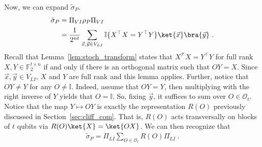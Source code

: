 \documentclass[11pt]{article}
\newcommand{\T}{\ensuremath{\mathcal{T}}}
\newcommand{\id}{\ensuremath{\mathbb{I}}}
\newcommand{\F}{\mathbb{F}}
\newcommand{\Oc}{\mathcal{O}}
\begin{document}
Now, we can expand $\tilde{\sigma}_P$.
\begin{align}
    \tilde{\sigma}_P & = \Pi_{VI} \rho_P \Pi_{VI}\\
    & = \frac{1}{2^{nt}} \sum_{\vec{x},\vec{y} \in V_{LI}}\id\{X^\top X = Y^\top Y\}\ket{\vec{x}}\bra{\vec{y}}\ .
\end{align}
Recall that Lemma~\ref{lem:stoch_transform} states that $X^\T X = Y^\top Y$ for full rank $X,Y \in \F_2^{t\times n}$ if and only if there is an orthogonal matrix such that $OY=X$. Since $\vec{x}, \vec{y} \in V_{LI}$, $X$ and $Y$ are full rank and this lemma applies. Further, notice that $OY\neq Y$ for any $O\neq \id$. Indeed, assume that $OY=Y$, then multiplying with the right inverse of $Y$ yields that $O = \id$. So, fixing $\vec{y}$, it suffices to sum over $O \in \Oc_t$. Notice that the map $Y\mapsto OY$ is exactly the representation $R(O)$ previously discussed in Section~\ref{sec:cliff_com}. That is, $R(O)$ acts transversally on blocks of $t$ qubits via $R(O)\ket{X} = \ket{OX}$. We can then recognize that
\begin{align}
    \tilde{\sigma}_P = \Pi_{LI} \sum_{O\in \Oc_t} R(O) \Pi_{LI}\ .
\end{align}
\end{document}
